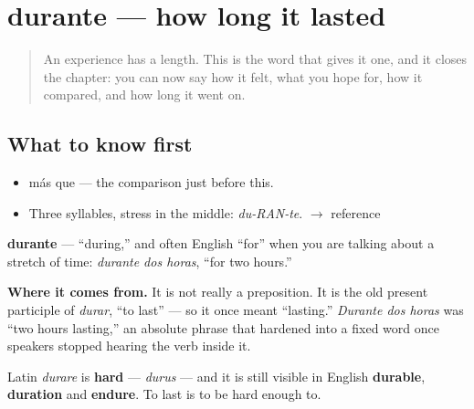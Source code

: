 \section[durante]{durante — how long it lasted}

\label{lesson:ES-C269-durante}



\begin{quote}
An experience has a length. This is the word that gives it one, and it closes the chapter: you can now say how it felt, what you hope for, how it compared, and how long it went on.
\end{quote}

\subsection*{What to know first}
\begin{itemize}
\raggedright
  \item más que — the comparison just before this.
\end{itemize}

\begin{sounds}
\begin{itemize}
\raggedright
  \item Three syllables, stress in the middle: \emph{du-RAN-te}. $\to$ reference
\end{itemize}
\end{sounds}

\begin{cousinweb}
\textbf{durante} — \textquotedblleft{}during,\textquotedblright{} and often English \textquotedblleft{}for\textquotedblright{} when you are talking about a stretch of time: \emph{durante dos horas}, \textquotedblleft{}for two hours.\textquotedblright{}

\textbf{Where it comes from.} It is not really a preposition. It is the old present participle of \emph{durar}, \textquotedblleft{}to last\textquotedblright{} — so it once meant \textquotedblleft{}lasting.\textquotedblright{} \emph{Durante dos horas} was \textquotedblleft{}two hours lasting,\textquotedblright{} an absolute phrase that hardened into a fixed word once speakers stopped hearing the verb inside it.

Latin \emph{durare} is \textbf{hard} — \emph{durus} — and it is still visible in English \textbf{durable}, \textbf{duration} and \textbf{endure}. To last is to be hard enough to.
\end{cousinweb}

